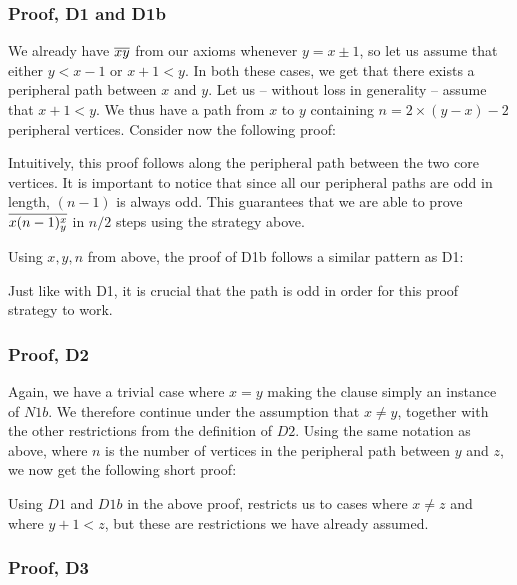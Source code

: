 \subsubsection{Proof, D1 and D1b}
\label{subs:Proof, D1 and D1b}
We already have $\overline{xy}$ from our axioms whenever $y = x \pm 1$, so let us assume that either $y < x-1$ or $x + 1 < y$.
In both these cases, we get that there exists a peripheral path between $x$ and $y$.
Let us -- without loss in generality -- assume that $x + 1 < y$.
We thus have a path from $x$ to $y$ containing $n = 2 \times (y - x) - 2$ peripheral vertices.
Consider now the following proof:
\begin{prooftree*}
\end{prooftree*}
Intuitively, this proof follows along the peripheral path between the two core vertices.
It is important to notice that since all our peripheral paths are odd in length, $(n-1)$ is always odd.
This guarantees that we are able to prove $\overline{x(n-1)^x_y}$ in $n/2$ steps using the strategy above.

Using $x,y,n$ from above, the proof of D1b follows a similar pattern as D1:
\begin{prooftree*}
\end{prooftree*}
Just like with D1, it is crucial that the path is odd in order for this proof strategy to work.
\subsubsection{Proof, D2}
\label{subs:Proof, D2}
Again, we have a trivial case where $x = y$ making the clause simply an instance of $N1b$.
We therefore continue under the assumption that $x \neq y$, together with the other restrictions from the definition of $D2$.
Using the same notation as above, where $n$ is the number of vertices in the peripheral path between $y$ and $z$, we now get the following short proof:
\begin{prooftree*}
\end{prooftree*}
Using $D1$ and $D1b$ in the above proof, restricts us to cases where $x \neq z$ and where $y+1 < z$, but these are restrictions we have already assumed.
\subsubsection{Proof, D3}
\label{subs:Proof, D3}
